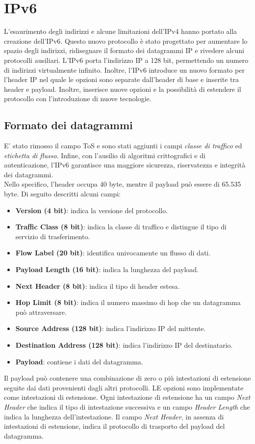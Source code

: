 \documentclass[12pt]{report}
\begin{document}
\section{IPv6}
L'esaurimento degli indirizzi e alcune limitazioni dell'IPv4 hanno portato alla creazione dell'IPv6. Questo nuovo protocollo è stato progettato per aumentare lo spazio degli indirizzi, ridisegnare il formato dei datagrammi IP e rivedere alcuni protocolli ausiliari. L'IPv6 porta l'indirizzo IP a 128 bit, permettendo un numero di indirizzi virtualmente infinito. Inoltre, l'IPv6 introduce un nuovo formato per l'header IP nel quale le opzioni sono separate dall'header di base e inserite tra header e payload. Inoltre, inserisce nuove opzioni e la possibilità di estendere il protocollo con l'introduzione di nuove tecnologie.

\subsection{Formato dei datagrammi}
E' stato rimosso il campo ToS e sono stati aggiunti i campi \textit{classe di traffico} ed \textit{etichetta di flusso}. Infine, con l'ausilio di algoritmi crittografici e di autenticazione, l'IPv6 garantisce una maggiore sicurezza, riservatezza e integrità dei datagrammi.
\vspace{\baselineskip}\\
Nello specifico, l'header occupa 40 byte, mentre il payload può essere di 65.535 byte. Di seguito descritti alcuni campi:
\begin{itemize}
	\item \textbf{Version (4 bit)}: indica la versione del protocollo.
	\item \textbf{Traffic Class (8 bit)}: indica la classe di traffico e distingue il tipo di servizio di trasferimento.
	\item \textbf{Flow Label (20 bit)}: identifica univocamente un flusso di dati.
	\item \textbf{Payload Length (16 bit)}: indica la lunghezza del payload.
	\item \textbf{Next Header (8 bit)}: indica il tipo di header estesa.
	\item \textbf{Hop Limit (8 bit)}: indica il numero massimo di hop che un datagramma può attraversare.
	\item \textbf{Source Address (128 bit)}: indica l'indirizzo IP del mittente.
	\item \textbf{Destination Address (128 bit)}: indica l'indirizzo IP del destinatario.
	\item \textbf{Payload}: contiene i dati del datagramma.
\end{itemize}
Il payload può contenere una combinazione di zero o più intestazioni di estensione seguite dai dati provenienti dagli altri protocolli. LE opzioni sono implementate come intestazioni di estensione. Ogni intestazione di estensione ha un campo \textit{Next Header} che indica il tipo di intestazione successiva e un campo \textit{Header Length} che indica la lunghezza dell'intestazione. Il campo \textit{Next Header}, in assenza di intestazioni di estensione, indica il protocollo di trasporto del payload del datagramma.
\end{document}
